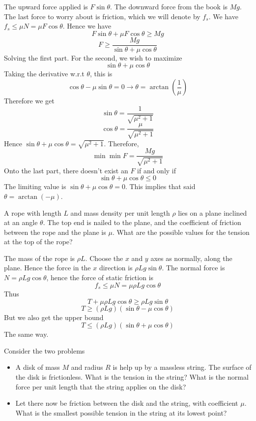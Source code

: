 \documentclass[11pt]{scrartcl}
\begin{document}
\begin{soln}
  The upward force applied is $F\sin\theta$. The downward force from the book
  is $Mg$. The last force to worry about is friction, which we will denote by
  $f_s$. We have $f_s\le \mu N=\mu F\cos\theta$. Hence we have
  $$F\sin\theta+\mu F\cos\theta\ge Mg$$
  $$F\ge \frac{Mg}{\sin\theta+\mu\cos\theta}$$
  Solving the first part. For the second, we wish to maximize
  $$\sin\theta+\mu\cos\theta$$
  Taking the derivative w.r.t $\theta$, this is
  $$\cos\theta-\mu\sin\theta=0\to \theta=\arctan\left(\frac{1}{\mu}\right)$$
  Therefore we get
  $$\sin\theta=\frac{1}{\sqrt{\mu^2+1}}$$
  $$\cos\theta=\frac{\mu}{\sqrt{\mu^2+1}}$$
  Hence $\sin\theta+\mu\cos\theta=\sqrt{\mu^2+1}$. Therefore,
  $$\min\min F=\frac{Mg}{\sqrt{\mu^2+1}}$$
  Onto the last part, there doesn't exist an $F$ if and only if
  $$\sin\theta+\mu\cos\theta\le 0$$
  The limiting value is $\sin\theta+\mu\cos\theta=0$. This implies that
  said $\theta=\arctan(-\mu)$.
\end{soln}
\begin{example}
  A rope with length $L$ and mass density per unit length $\rho$ lies on a plane
  inclined at an angle $\theta$. The top end is nailed to the plane, and the
  coefficient of friction between the rope and the plane is $\mu$. What are
  the possible values for the tension at the top of the rope?
\end{example}
\begin{soln}
  The mass of the rope is $\rho L$. Choose the $x$ and $y$ axes as normally,
  along the plane. Hence the force in the $x$ direction is $\rho Lg\sin\theta$.
  The normal force is $N=\rho Lg\cos\theta$, hence the force of static friction is
  $$f_s\le \mu N=\mu \rho Lg\cos\theta$$
  Thus
  $$T+\mu\rho Lg\cos\theta\ge \rho Lg\sin\theta$$
  $$T\ge (\rho Lg)(\sin\theta-\mu\cos\theta)$$
  But we also get the upper bound
  $$T\le (\rho Lg)(\sin\theta+\mu\cos\theta)$$
  The same way.
\end{soln}
\begin{example}
  Consider the two problems
  \begin{itemize}
    \item A disk of mass $M$ and radius $R$ is help up by a massless string.
      The surface of the disk is frictionless. What is the tension
      in the string? What is the normal force per unit length that the string
      applies on the disk?
    \item Let there now be friction between the disk and the string, with
      coefficient $\mu$. What is the smallest possible tension in the string
      at its lowest point?
  \end{itemize}
\end{example}
\end{document}
